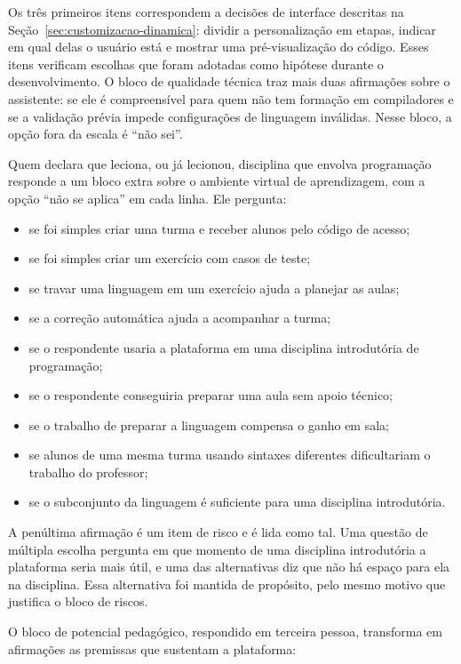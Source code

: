 Os três primeiros itens correspondem a decisões de interface descritas na Seção~\ref{sec:customizacao-dinamica}: dividir a personalização em etapas, indicar em qual delas o usuário está e mostrar uma pré-visualização do código. Esses itens verificam escolhas que foram adotadas como hipótese durante o desenvolvimento. O bloco de qualidade técnica traz mais duas afirmações sobre o assistente: se ele é compreensível para quem não tem formação em compiladores e se a validação prévia impede configurações de linguagem inválidas. Nesse bloco, a opção fora da escala é ``não sei''.

Quem declara que leciona, ou já lecionou, disciplina que envolva programação responde a um bloco extra sobre o ambiente virtual de aprendizagem, com a opção ``não se aplica'' em cada linha. Ele pergunta:

\begin{itemize}
    \item se foi simples criar uma turma e receber alunos pelo código de acesso;
    \item se foi simples criar um exercício com casos de teste;
    \item se travar uma linguagem em um exercício ajuda a planejar as aulas;
    \item se a correção automática ajuda a acompanhar a turma;
    \item se o respondente usaria a plataforma em uma disciplina introdutória de programação;
    \item se o respondente conseguiria preparar uma aula sem apoio técnico;
    \item se o trabalho de preparar a linguagem compensa o ganho em sala;
    \item se alunos de uma mesma turma usando sintaxes diferentes dificultariam o trabalho do professor;
    \item se o subconjunto da linguagem é suficiente para uma disciplina introdutória.
\end{itemize}
 A penúltima afirmação é um item de risco e é lida como tal. Uma questão de múltipla escolha pergunta em que momento de uma disciplina introdutória a plataforma seria mais útil, e uma das alternativas diz que não há espaço para ela na disciplina. Essa alternativa foi mantida de propósito, pelo mesmo motivo que justifica o bloco de riscos.

O bloco de potencial pedagógico, respondido em terceira pessoa, transforma em afirmações as premissas que sustentam a plataforma:

